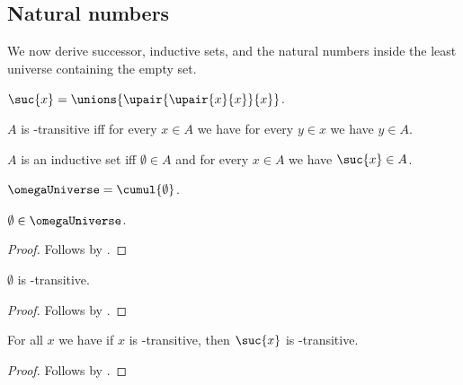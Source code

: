 \subsection{Natural numbers}

We now derive successor, inductive sets, and the natural numbers inside the
least universe containing the empty set.

\begin{definition}[Successor]\label{suc}
    $\suc{x} = \unions{\upair{\upair{x}{x}}{x}}$.
\end{definition}

\begin{definition}\label{transitiveset}
    $A$ is \in-transitive iff
    for every $x\in A$ we have
    for every $y\in x$ we have $y\in A$.
\end{definition}

\begin{definition}\label{inductive_set}
    $A$ is an inductive set iff
    $\emptyset\in A$ and
    for every $x\in A$ we have $\suc{x}\in A$.
\end{definition}

\begin{definition}\label{omega_universe}
    $\omegaUniverse = \cumul{\emptyset}$.
\end{definition}

\begin{proposition}%
\label{omega_universe_empty}
    $\emptyset \in \omegaUniverse$.
\end{proposition}
\begin{proof}
    Follows by .
\end{proof}

\begin{proposition}\label{emptyset_transitive}
    $\emptyset$ is \in-transitive.
\end{proposition}
\begin{proof}
    Follows by .
\end{proof}

\begin{proposition}%
\label{successor_transitive}
    For all $x$ we have if $x$ is \in-transitive, then
    $\suc{x}$ is \in-transitive.
\end{proposition}
\begin{proof}
    Follows by .
\end{proof}

